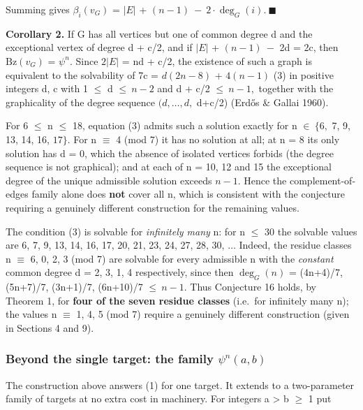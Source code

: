 \documentclass[
]{article}
\begin{document}
Summing gives \(\beta_i(v_G)\) = \(\vert E\vert\) +
\((n-1)\ -\ 2\cdot\deg_G(i).\ \blacksquare\)

\textbf{Corollary 2.} If G has all vertices but one of common degree d
and the exceptional vertex of degree d + c/2, and if \(\vert E\vert\) +
\((n-1)\ -\) 2d = 2c, then \(\mathrm{Bz}(v_G)\) = \(\psi^n.\) Since
\(2\vert E\vert\) = nd + c/2, the existence of such a graph is
equivalent to the solvability of 7c = \(d(2n-8)\) + \(4(n-1)\) (3) in
positive integers d, c with 1 \(\le\) d \(\le\ n-2\) and d + c/2
\(\le\ n-1,\) together with the graphicality of the degree sequence
\((d,\dots,d,\) d+c/2) (Erdős \& Gallai 1960).

For 6 \(\le\) n \(\le\) 18, equation (3) admits such a solution exactly
for n \(\in\ \{6,\) 7, 9, 13, 14, 16, \(17\}.\) For n \(\equiv\) 4 (mod
7) it has no solution at all; at n = 8 its only solution has d = 0,
which the absence of isolated vertices forbids (the degree sequence is
not graphical); and at each of n = 10, 12 and 15 the exceptional degree
of the unique admissible solution exceeds \(n-1.\) Hence the
complement-of-edges family alone does \textbf{not} cover all n, which is
consistent with the conjecture requiring a genuinely different
construction for the remaining values.

The condition (3) is solvable for \emph{infinitely many} n: for n
\(\le\) 30 the solvable values are 6, 7, 9, 13, 14, 16, 17, 20, 21, 23,
24, 27, 28, 30, \(\dots\) Indeed, the residue classes n \(\equiv\) 6, 0,
2, 3 (mod 7) are solvable for every admissible n with the
\emph{constant} common degree d = 2, 3, 1, 4 respectively, since then
\(\deg_G(n)\) = (4n+4)/7, (5n+7)/7, (3n+1)/7, (6n+10)/7 \(\le\ n-1.\)
Thus Conjecture 16 holds, by Theorem 1, for \textbf{four of the seven
residue classes} (i.e.~for infinitely many n); the values n \(\equiv\)
1, 4, 5 (mod 7) require a genuinely different construction (given in
Sections 4 and 9).

\subsubsection{\texorpdfstring{Beyond the single target: the family
\(\psi^n(a,b)\)}{Beyond the single target: the family \textbackslash psi\^{}n(a,b)}}\label{beyond-the-single-target-the-family-ux3c8ux207fab}

The construction above answers (1) for one target. It extends to a
two-parameter family of targets at no extra cost in machinery. For
integers a \textgreater{} b \(\ge\) 1 put
\end{document}
